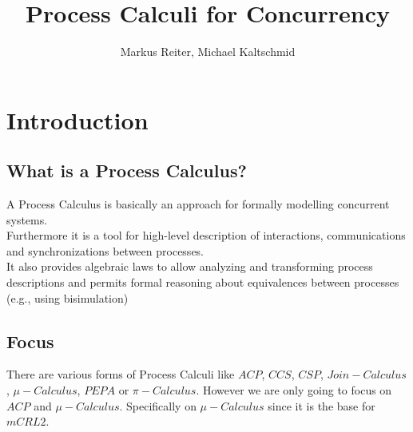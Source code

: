 \documentclass{report}
\title{Process Calculi for Concurrency}
\author{Markus Reiter, Michael Kaltschmid}
\begin{document}
  \maketitle
  \tableofcontents

  \section{Introduction}
  \subsection{What is a Process Calculus?}
  A Process Calculus is basically an approach for formally modelling concurrent systems. \\
  Furthermore it is a tool for high-level description of interactions, communications and synchronizations between processes. \\
  It also provides algebraic laws to allow analyzing and transforming process descriptions and permits formal reasoning about equivalences between processes (e.g., using bisimulation) \\

  \subsection{Focus}
  There are various forms of Process Calculi like $ACP$, $CCS$, $CSP$, $Join-Calculus$, $\mu-Calculus$, $PEPA$ or $\pi-Calculus$. However we are only going to focus on $ACP$ and $\mu-Calculus$. Specifically on $\mu-Calculus$ since it is the base for $mCRL2$.

  
\end{document}
